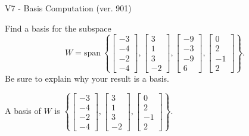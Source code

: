 \begin{exercise}
  \begin{exerciseTitle}V7 - Basis Computation (ver. 901)\end{exerciseTitle}
  \begin{exerciseStatement}
    Find a basis for the subspace 
\[W=\mathrm{span}\ \left\{\left[\begin{array}{r}
-3 \\
-4 \\
-2 \\
-4
\end{array}\right] , \left[\begin{array}{r}
3 \\
1 \\
3 \\
-2
\end{array}\right] , \left[\begin{array}{r}
-9 \\
-3 \\
-9 \\
6
\end{array}\right] , \left[\begin{array}{r}
0 \\
2 \\
-1 \\
2
\end{array}\right]\right\}.\]
 Be sure to explain why your result is a basis.


  \end{exerciseStatement}
  \begin{exerciseAnswer}
   A basis of \(W\) is  \(\left\{\left[\begin{array}{r}
-3 \\
-4 \\
-2 \\
-4
\end{array}\right] , \left[\begin{array}{r}
3 \\
1 \\
3 \\
-2
\end{array}\right] , \left[\begin{array}{r}
0 \\
2 \\
-1 \\
2
\end{array}\right]\right\}\).
  


  \end{exerciseAnswer}
\end{exercise}